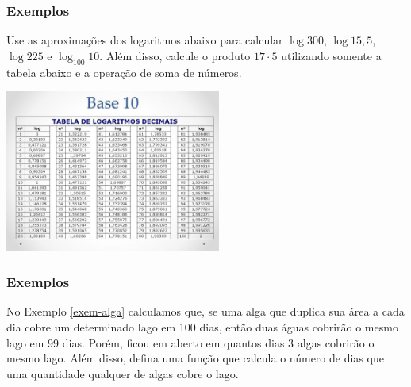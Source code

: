 \begin{frame}
	\frametitle{Exemplos} 

	\begin{exemplo}
		Use as aproximações dos logaritmos abaixo para calcular $\log 300$, $\log 15{,}5$, $\log 225$ e $\log_{100}10$. Além disso, calcule o produto $17 \cdot 5$ utilizando somente a tabela abaixo e a operação de soma de números.
		\begin{center}
			\includegraphics[width=7.1cm]{figures/tabua-log.jpg}
			\end{center}
		\end{exemplo}
	\end{frame}

\begin{frame}
	\frametitle{Exemplos} 

	\begin{exemplo}
	No Exemplo \ref{exem-alga} calculamos que, se uma alga que duplica sua área a cada dia cobre um determinado lago em 100 dias, então duas águas cobrirão o mesmo lago em 99 dias. Porém, ficou em aberto em quantos dias 3 algas cobrirão o mesmo lago. Além disso, defina uma função que calcula o número de dias que uma quantidade qualquer de algas cobre o lago.
	\end{exemplo}
	
	
	\end{frame}